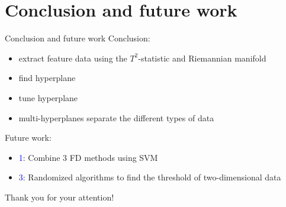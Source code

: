 \documentclass[10pt]{beamer}
\begin{document}
\section{Conclusion and future work}

\begin{frame}{Conclusion and future work}
Conclusion:
\begin{itemize}
    \item extract feature data using the $T^2$-statistic and Riemannian manifold
    \item find hyperplane
    \item tune hyperplane
    \item multi-hyperplanes separate the different types of data
\end{itemize}
Future work:
     \begin{itemize}
      \item \textcolor{blue}{1}: Combine 3 FD methods using SVM
      \item \textcolor{blue}{3}: Randomized algorithms to find the threshold of two-dimensional data 
 	 \end{itemize}  
\end{frame}

\begin{frame}[standout]
\begin{center}
Thank you for your attention!
\end{center}
\end{frame}
\end{document}
